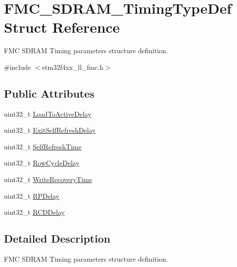 \hypertarget{struct_f_m_c___s_d_r_a_m___timing_type_def}{}\section{F\+M\+C\+\_\+\+S\+D\+R\+A\+M\+\_\+\+Timing\+Type\+Def Struct Reference}
\label{struct_f_m_c___s_d_r_a_m___timing_type_def}


F\+MC S\+D\+R\+AM Timing parameters structure definition.  




{\ttfamily \#include $<$stm32f4xx\+\_\+ll\+\_\+fmc.\+h$>$}

\subsection*{Public Attributes}
\begin{DoxyCompactItemize}
\item 
uint32\+\_\+t \hyperlink{struct_f_m_c___s_d_r_a_m___timing_type_def_aa4e0baa631f3af95366dae966699f102}{Load\+To\+Active\+Delay}
\item 
uint32\+\_\+t \hyperlink{struct_f_m_c___s_d_r_a_m___timing_type_def_a05c3b7b4946d8fa707e5263a39baf73d}{Exit\+Self\+Refresh\+Delay}
\item 
uint32\+\_\+t \hyperlink{struct_f_m_c___s_d_r_a_m___timing_type_def_a8847315f4ac89d7278021ca07281f6f1}{Self\+Refresh\+Time}
\item 
uint32\+\_\+t \hyperlink{struct_f_m_c___s_d_r_a_m___timing_type_def_ad766564847851a0d5cda78f70a7c7b1e}{Row\+Cycle\+Delay}
\item 
uint32\+\_\+t \hyperlink{struct_f_m_c___s_d_r_a_m___timing_type_def_a9b4e896e7795ac9a32339a0e6520975e}{Write\+Recovery\+Time}
\item 
uint32\+\_\+t \hyperlink{struct_f_m_c___s_d_r_a_m___timing_type_def_a499042750059231bf7fc5bf9fc2c46aa}{R\+P\+Delay}
\item 
uint32\+\_\+t \hyperlink{struct_f_m_c___s_d_r_a_m___timing_type_def_a99beff6ce115b68684c7872a9196e61d}{R\+C\+D\+Delay}
\end{DoxyCompactItemize}


\subsection{Detailed Description}
F\+MC S\+D\+R\+AM Timing parameters structure definition. 

